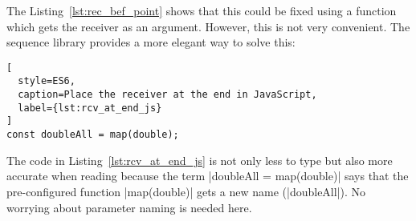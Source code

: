 The Listing~\ref{lst:rec_bef_point} shows that this could be fixed using a
function which gets the receiver as an argument. However, this is not very
convenient. The sequence library provides a more elegant way to solve this:

\begin{lstlisting}[
  style=ES6,
  caption=Place the receiver at the end in JavaScript,
  label={lst:rcv_at_end_js}
]
const doubleAll = map(double);
\end{lstlisting}

The code in Listing~\ref{lst:rcv_at_end_js} is not only less to type but also
more accurate when reading because the term |doubleAll = map(double)| says that
the pre-configured function |map(double)| gets a new name (|doubleAll|). No worrying about
parameter naming is needed here.

